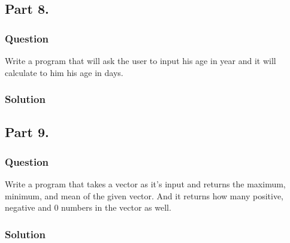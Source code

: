 \documentclass[a4paper, 10pt]{article}
\begin{document}
		\subsection{Part 8.}
			\subsubsection{Question}
				\noindent Write a program that will ask the user to input his age in year and it will calculate to him his age in days.
			\subsubsection{Solution}
				
		\pagebreak
		\subsection{Part 9.}
			\subsubsection{Question}
				\noindent Write a program that takes a vector as it’s input and returns the maximum, minimum, and mean of the 
				given vector. And it returns how many positive, negative and 0 numbers in the vector as well.
			\subsubsection{Solution}
				
\end{document}
